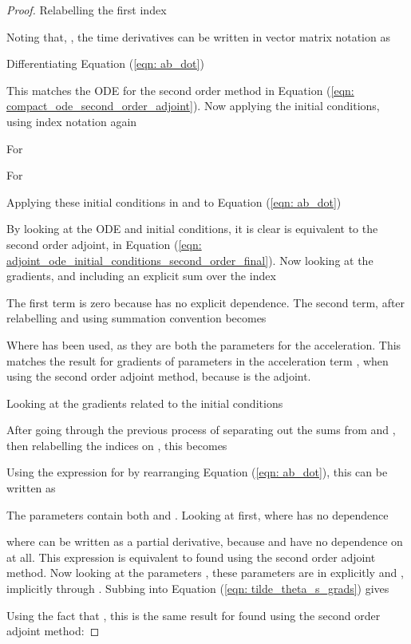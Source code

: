 \documentclass{article}
\theoremstyle{remark}
\theoremstyle{definition}
\begin{document}
\begin{proof}
Relabelling the first index 


Noting that, 
, the time derivatives can be written in vector matrix notation as




Differentiating Equation (\ref{eqn: ab_dot})


This matches the ODE for the second order method in Equation (\ref{eqn: compact_ode_second_order_adjoint}). Now applying the initial conditions, using index notation again


For 


For 


Applying these initial conditions in  and  to Equation (\ref{eqn: ab_dot})


By looking at the ODE and initial conditions, it is clear  is equivalent to the second order adjoint, in Equation (\ref{eqn: adjoint_ode_initial_conditions_second_order_final}). Now looking at the gradients, and including an explicit sum over the index



The first term is zero because  has no explicit  dependence. The second term, after relabelling and using summation convention becomes


Where  has been used, as they are both the parameters for the acceleration. This matches the result for gradients of parameters in the acceleration term , when using the second order adjoint method, because  is the adjoint.

Looking at the gradients related to the initial conditions


After going through the previous process of separating out the sums from  and , then relabelling the indices on , this becomes


Using the expression for  by rearranging Equation (\ref{eqn: ab_dot}), this can be written as


The parameters  contain both  and . Looking at  first, where  has no dependence


where  can be written as a partial derivative, because  and  have no dependence on  at all. This expression is equivalent to  found using the second order adjoint method. Now looking at the parameters , these parameters are in  explicitly and , implicitly through . Subbing  into Equation (\ref{eqn: tilde_theta_s_grads}) gives



Using the fact that , this is the same result for  found using the second order adjoint method: 




\end{proof}
\end{document}
